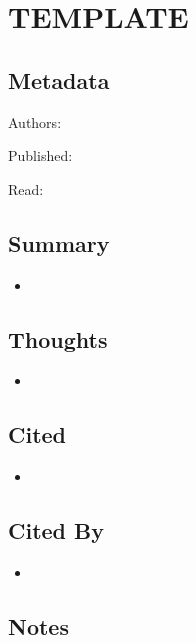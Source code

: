 \documentclass{article}
\begin{document}
\pagebreak


\section*{TEMPLATE}

\subsection*{Metadata}

\noindent Authors: 

\noindent Published:

\noindent Read:

\subsection*{Summary}
\begin{itemize}
	\item
\end{itemize}

\subsection*{Thoughts}
\begin{itemize}
	\item
\end{itemize}

\subsection*{Cited}
\begin{itemize}
	\item
\end{itemize}

\subsection*{Cited By}
\begin{itemize}
	\item
\end{itemize}

\subsection*{Notes}
\end{document}
